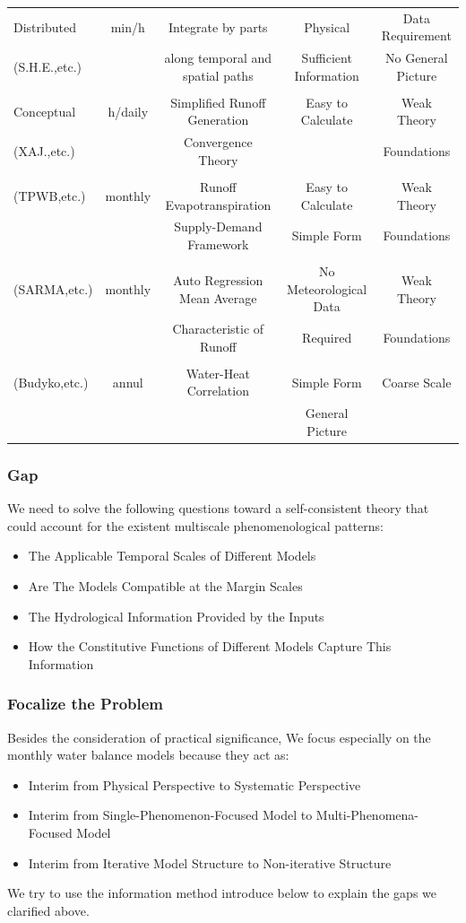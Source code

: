 \documentclass{beamer}
\begin{document}
\begin{CJK}{UTF8}{gkai}
\begin{frame}
\begin{table}[H]
\begin{center}
\begin{tabular}{l cccc}
\midrule
Distributed  & min/h & Integrate by parts  & Physical &  Data Requirement\\ 
(S.H.E.,etc.) &&along temporal and spatial paths& Sufficient Information  &  No General Picture  \\
\\
Conceptual  & h/daily & Simplified Runoff Generation  & Easy to Calculate &  Weak Theory \\ 
(XAJ.,etc.) &&Convergence Theory&    &  Foundations \\
\\
(TPWB,etc.)&monthly& Runoff Evapotranspiration& Easy to Calculate &Weak Theory   \\
&&Supply-Demand Framework&Simple Form &Foundations\\
\\
(SARMA,etc.)&monthly& Auto Regression Mean Average& No Meteorological Data &Weak Theory   \\
&& Characteristic of Runoff & Required &Foundations\\
\\
(Budyko,etc.)&annul&Water-Heat Correlation& Simple Form &  Coarse Scale\\
 & & &General Picture&\\
\bottomrule
\end{tabular}
\end{center}
\end{table}
\end{frame}

\begin{frame}
\frametitle{Gap}
We need to solve the following questions toward a self-consistent theory that could account for the existent multiscale phenomenological patterns:
\begin{itemize}
\item The Applicable Temporal Scales of Different Models
\item Are The Models Compatible at the Margin Scales
\item The Hydrological Information Provided by the Inputs
\item How the Constitutive Functions of Different Models Capture This Information
\end{itemize}
\end{frame}

\begin{frame}
\frametitle{Focalize the Problem}
Besides the consideration of practical significance, We focus especially on the monthly water balance models because they act as:
\begin{itemize}
\item Interim from Physical Perspective to Systematic Perspective
\item Interim from Single-Phenomenon-Focused Model to Multi-Phenomena-Focused Model
\item Interim from Iterative Model Structure to Non-iterative Structure
\end{itemize}
We try to use the information method introduce below to explain the gaps we clarified above.
\end{frame}





\end{CJK}
\end{document}
